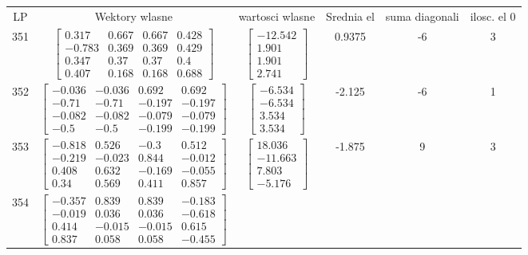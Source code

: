 \documentclass[a4paper,12pt]{article}
\begin{document}
\bgroup {} \vspace{0.2in} \begin{tabular}{c c c c c c}
LP &Wektory wlasne & wartosci wlasne & Srednia el & suma diagonali & ilosc. el 0\\
351
&
$\begin{bmatrix} 0.317 & 0.667 & 0.667 & 0.428 \\ -0.783 & 0.369 & 0.369 & 0.429 \\ 0.347 & 0.37 & 0.37 & 0.4 \\ 0.407 & 0.168 & 0.168 & 0.688 \end{bmatrix}$
&
$\begin{bmatrix} -12.542 \\ 1.901 \\ 1.901 \\ 2.741 \end{bmatrix}$
&
0.9375
&
-6
&
3
\\
352
&
$\begin{bmatrix} -0.036 & -0.036 & 0.692 & 0.692 \\ -0.71 & -0.71 & -0.197 & -0.197 \\ -0.082 & -0.082 & -0.079 & -0.079 \\ -0.5 & -0.5 & -0.199 & -0.199 \end{bmatrix}$
&
$\begin{bmatrix} -6.534 \\ -6.534 \\ 3.534 \\ 3.534 \end{bmatrix}$
&
-2.125
&
-6
&
1
\\
353
&
$\begin{bmatrix} -0.818 & 0.526 & -0.3 & 0.512 \\ -0.219 & -0.023 & 0.844 & -0.012 \\ 0.408 & 0.632 & -0.169 & -0.055 \\ 0.34 & 0.569 & 0.411 & 0.857 \end{bmatrix}$
&
$\begin{bmatrix} 18.036 \\ -11.663 \\ 7.803 \\ -5.176 \end{bmatrix}$
&
-1.875
&
9
&
3
\\
354
&
$\begin{bmatrix} -0.357 & 0.839 & 0.839 & -0.183 \\ -0.019 & 0.036 & 0.036 & -0.618 \\ 0.414 & -0.015 & -0.015 & 0.615 \\ 0.837 & 0.058 & 0.058 & -0.455 \end{bmatrix}$

\end{tabular}
\end{document}

